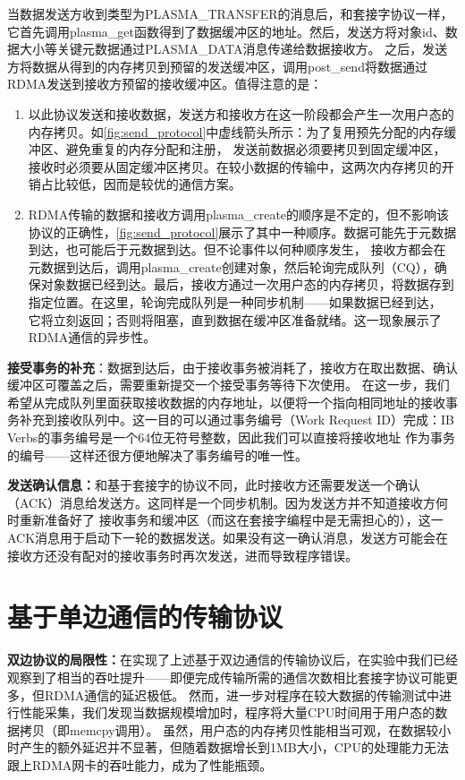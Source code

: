 当数据发送方收到类型为PLASMA\_TRANSFER的消息后，和套接字协议一样，它首先调用plasma\_get函数得到了数据缓冲区的地址。然后，发送方将对象id、数据大小等关键元数据通过PLASMA\_DATA消息传递给数据接收方。
之后，发送方将数据从得到的内存拷贝到预留的发送缓冲区，调用post\_send将数据通过RDMA发送到接收方预留的接收缓冲区。值得注意的是：

\begin{enumerate}
	\item 以此协议发送和接收数据，发送方和接收方在这一阶段都会产生一次用户态的内存拷贝。如\autoref{fig:send_protocol}中虚线箭头所示：为了复用预先分配的内存缓冲区、避免重复的内存分配和注册，
	发送前数据必须要拷贝到固定缓冲区，接收时必须要从固定缓冲区拷贝。在较小数据的传输中，这两次内存拷贝的开销占比较低，因而是较优的通信方案。
	\item RDMA传输的数据和接收方调用plasma\_create的顺序是不定的，但不影响该协议的正确性，\autoref{fig:send_protocol}展示了其中一种顺序。数据可能先于元数据到达，也可能后于元数据到达。但不论事件以何种顺序发生，
	接收方都会在元数据到达后，调用plasma\_create创建对象，然后轮询完成队列（CQ），确保对象数据已经到达。最后，接收方通过一次用户态的内存拷贝，将数据存到指定位置。在这里，轮询完成队列是一种同步机制——如果数据已经到达，
	它将立刻返回；否则将阻塞，直到数据在缓冲区准备就绪。这一现象展示了RDMA通信的异步性。
\end{enumerate}

\textbf{接受事务的补充}：数据到达后，由于接收事务被消耗了，接收方在取出数据、确认缓冲区可覆盖之后，需要重新提交一个接受事务等待下次使用。
在这一步，我们希望从完成队列里面获取接收数据的内存地址，以便将一个指向相同地址的接收事务补充到接收队列中。这一目的可以通过事务编号（Work Request ID）完成：IB Verbs的事务编号是一个64位无符号整数，因此我们可以直接将接收地址
作为事务的编号——这样还很方便地解决了事务编号的唯一性。

\textbf{发送确认信息：}和基于套接字的协议不同，此时接收方还需要发送一个确认（ACK）消息给发送方。这同样是一个同步机制。因为发送方并不知道接收方何时重新准备好了
接收事务和缓冲区（而这在套接字编程中是无需担心的），这一ACK消息用于启动下一轮的数据发送。如果没有这一确认消息，发送方可能会在接收方还没有配对的接收事务时再次发送，进而导致程序错误。

\section{基于单边通信的传输协议}
\label{sec:read}

\textbf{双边协议的局限性：}在实现了上述基于双边通信的传输协议后，在实验中我们已经观察到了相当的吞吐提升——即便完成传输所需的通信次数相比套接字协议可能更多，但RDMA通信的延迟极低。
然而，进一步对程序在较大数据的传输测试中进行性能采集，我们发现当数据规模增加时，程序将大量CPU时间用于用户态的数据拷贝（即memcpy调用）。
虽然，用户态的内存拷贝性能相当可观，在数据较小时产生的额外延迟并不显著，但随着数据增长到1MB大小，CPU的处理能力无法跟上RDMA网卡的吞吐能力，成为了性能瓶颈。

